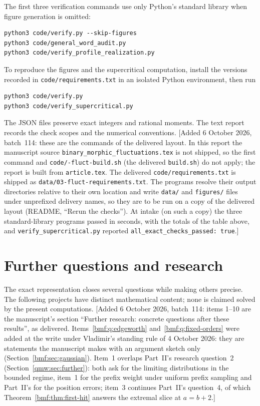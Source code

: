 \documentclass[11pt]{article}
\numberwithin{equation}{section}
\theoremstyle{definition}
\theoremstyle{remark}
\begin{document}
The first three verification commands use only Python's standard
library when figure generation is omitted:
\begin{verbatim}
python3 code/verify.py --skip-figures
python3 code/general_word_audit.py
python3 code/verify_profile_realization.py
\end{verbatim}
To reproduce the figures and the supercritical computation, install
the versions recorded in \texttt{code/requirements.txt} in an
isolated Python environment, then run
\begin{verbatim}
python3 code/verify.py
python3 code/verify_supercritical.py
\end{verbatim}
The JSON files preserve exact integers and rational moments.
The text report records the check scopes and the numerical
conventions.
[Added 6 October 2026, batch~114: these are the commands of the delivered
layout. In this report the manuscript source
\texttt{binary\_\allowbreak morphic\_\allowbreak fluctuations.tex} is not shipped, so the
first command and \texttt{code/-fluct-build.sh} (the delivered
\texttt{build.sh}) do not apply; the report is built from
\texttt{article.tex}. The delivered \texttt{code/requirements.txt} is
shipped as \texttt{data/03-fluct-requirements.txt}. The programs resolve
their output directories relative to their own location and write
\texttt{data/} and \texttt{figures/} files under unprefixed delivery names,
so they are to be run on a copy of the delivered layout (README, ``Rerun
the checks''). At intake (on such a copy) the three standard-library
programs passed in seconds, with the totals of the table above, and
\texttt{verify\_supercritical.py} reported
\texttt{all\_exact\_checks\_passed: true}.]

\clearpage
\section{Further questions and research}
\label{bmf:sec:research}

The exact representation closes several questions while making
others precise. The following projects have distinct mathematical
content; none is claimed solved by the present computations.
[Added 6 October 2026, batch~114: items 1--10 are the manuscript's
section ``Further research: concrete questions after these results'', as
delivered. Items~\ref{bmf:q:edgeworth} and~\ref{bmf:q:fixed-orders} were
added at the write under Vladimir's standing rule of 4 October 2026: they
are statements the manuscript makes with an argument sketch only
(Section~\ref{bmf:sec:gaussian}). Item~1 overlaps Part~II's research
question~2 (Section~\ref{qmw:sec:further}): both ask for the limiting
distributions in the bounded regime, item~1 for the prefix weight under
uniform prefix sampling and Part~II's for the position errors;
item~3 continues Part~II's question~4, of which
Theorem~\ref{bmf:thm:first-hit} answers the extremal slice at $a=b+2$.]
\end{document}
